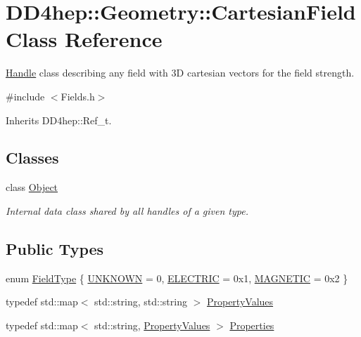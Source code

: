 \hypertarget{class_d_d4hep_1_1_geometry_1_1_cartesian_field}{
\section{DD4hep::Geometry::CartesianField Class Reference}
\label{class_d_d4hep_1_1_geometry_1_1_cartesian_field}
}


\hyperlink{class_d_d4hep_1_1_handle}{Handle} class describing any field with 3D cartesian vectors for the field strength.  


{\ttfamily \#include $<$Fields.h$>$}

Inherits DD4hep::Ref\_\-t.\subsection*{Classes}
\begin{DoxyCompactItemize}
\item 
class \hyperlink{class_d_d4hep_1_1_geometry_1_1_cartesian_field_1_1_object}{Object}
\begin{DoxyCompactList}\small\item\em Internal data class shared by all handles of a given type. \item\end{DoxyCompactList}\end{DoxyCompactItemize}
\subsection*{Public Types}
\begin{DoxyCompactItemize}
\item 
enum \hyperlink{class_d_d4hep_1_1_geometry_1_1_cartesian_field_aa56ad95ffc11f27e7e793c9479680b78}{FieldType} \{ \hyperlink{class_d_d4hep_1_1_geometry_1_1_cartesian_field_aa56ad95ffc11f27e7e793c9479680b78a5a722f0da5938358899c908e35d4b1ab}{UNKNOWN} =  0, 
\hyperlink{class_d_d4hep_1_1_geometry_1_1_cartesian_field_aa56ad95ffc11f27e7e793c9479680b78afaf0fbca8e9d9556c784207943f88313}{ELECTRIC} =  0x1, 
\hyperlink{class_d_d4hep_1_1_geometry_1_1_cartesian_field_aa56ad95ffc11f27e7e793c9479680b78a866e3d72a57ad60654afcedfa068e36b}{MAGNETIC} =  0x2
 \}
\item 
typedef std::map$<$ std::string, std::string $>$ \hyperlink{class_d_d4hep_1_1_geometry_1_1_cartesian_field_a05dc63b1528e795f7d877d3fb236c394}{PropertyValues}
\item 
typedef std::map$<$ std::string, \hyperlink{class_d_d4hep_1_1_geometry_1_1_cartesian_field_a05dc63b1528e795f7d877d3fb236c394}{PropertyValues} $>$ \hyperlink{class_d_d4hep_1_1_geometry_1_1_cartesian_field_a37a636b9f5ee9ead172cca958dacb920}{Properties}
\end{DoxyCompactItemize}
